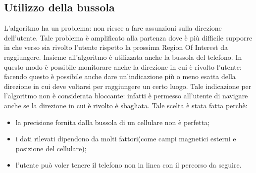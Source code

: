 \documentclass[../SperimentazioniPratiche.tex]{subfiles}
\begin{document}
	\subsection{Utilizzo della bussola}
		L'algoritmo ha un problema: non riesce a fare assunzioni sulla direzione dell'utente. Tale problema è amplificato alla partenza dove è più difficile supporre in che verso sia rivolto l'utente rispetto la prossima Region Of Interest da raggiungere. Insieme all'algoritmo è utilizzata anche la bussola del telefono. In questo modo è possibile monitorare anche la direzione in cui è rivolto l'utente: facendo questo è possibile anche dare un'indicazione più o meno esatta della direzione in cui deve voltarsi per raggiungere un certo luogo. Tale indicazione per l'algoritmo non è considerata bloccante: infatti è permesso all'utente di navigare anche se la direzione in cui è rivolto è sbagliata. Tale scelta è stata fatta perchè:
		\begin{itemize}
			\item la precisione fornita dalla bussola di un cellulare non è perfetta;
			\item i dati rilevati dipendono da molti fattori(come campi magnetici esterni e posizione del cellulare);
			\item l'utente può voler tenere il telefono non in linea con il percorso da seguire.
		\end{itemize}
		
\end{document}
